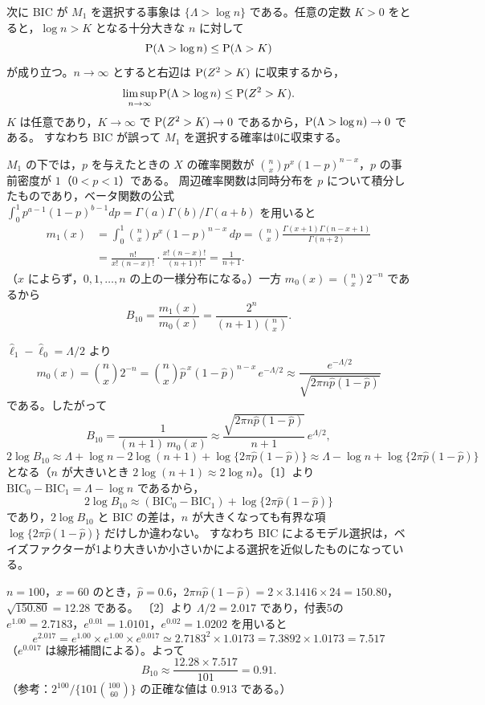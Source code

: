 \documentclass[a4paper,11pt]{ltjsarticle}
\begin{document}
次に BIC が $M_1$ を選択する事象は $\{\Lambda>\log n\}$ である。任意の定数 $K>0$ をとると，$\log n>K$ となる十分大きな $n$ に対して
\[
\operatorname{P}(\Lambda>\log n)\le\operatorname{P}(\Lambda>K)
\]
が成り立つ。$n\to\infty$ とすると右辺は $\operatorname{P}(Z^2>K)$ に収束するから，
\[
\limsup_{n\to\infty}\operatorname{P}(\Lambda>\log n)\le\operatorname{P}(Z^2>K).
\]
$K$ は任意であり，$K\to\infty$ で $\operatorname{P}(Z^2>K)\to0$ であるから，$\operatorname{P}(\Lambda>\log n)\to0$ である。
すなわち BIC が誤って $M_1$ を選択する確率は0に収束する。

$M_1$ の下では，$p$ を与えたときの $X$ の確率関数が $\binom nxp^x(1-p)^{n-x}$，$p$ の事前密度が $1$（$0<p<1$）である。
周辺確率関数は同時分布を $p$ について積分したものであり，ベータ関数の公式
$\int_0^1p^{a-1}(1-p)^{b-1}dp=\Gamma(a)\Gamma(b)/\Gamma(a+b)$ を用いると
\begin{align*}
m_1(x)&=\int_0^1\binom nxp^x(1-p)^{n-x}\,dp=\binom nx\frac{\Gamma(x+1)\Gamma(n-x+1)}{\Gamma(n+2)}\\
&=\frac{n!}{x!\,(n-x)!}\cdot\frac{x!\,(n-x)!}{(n+1)!}=\boxed{\frac{1}{n+1}}.
\end{align*}
（$x$ によらず，$0,1,\ldots,n$ の上の一様分布になる。）一方 $m_0(x)=\binom nx2^{-n}$ であるから
\[
B_{10}=\frac{m_1(x)}{m_0(x)}=\boxed{\frac{2^n}{(n+1)\binom nx}}.
\]

$\hat\ell_1-\hat\ell_0=\Lambda/2$ より
\[
m_0(x)=\binom nx2^{-n}=\binom nx\hat p^{\,x}(1-\hat p)^{n-x}\,e^{-\Lambda/2}
\approx\frac{e^{-\Lambda/2}}{\sqrt{2\pi n\hat p(1-\hat p)}}
\]
である。したがって
\[
B_{10}=\frac{1}{(n+1)\,m_0(x)}\approx\frac{\sqrt{2\pi n\hat p(1-\hat p)}}{n+1}\,e^{\Lambda/2},
\]
\[
2\log B_{10}\approx\Lambda+\log n-2\log(n+1)+\log\{2\pi\hat p(1-\hat p)\}
\approx\boxed{\Lambda-\log n+\log\{2\pi\hat p(1-\hat p)\}}
\]
となる（$n$ が大きいとき $2\log(n+1)\approx2\log n$）。〔1〕より $\mathrm{BIC}_0-\mathrm{BIC}_1=\Lambda-\log n$ であるから，
\[
2\log B_{10}\approx(\mathrm{BIC}_0-\mathrm{BIC}_1)+\log\{2\pi\hat p(1-\hat p)\}
\]
であり，$2\log B_{10}$ と BIC の差は，$n$ が大きくなっても有界な項 $\log\{2\pi\hat p(1-\hat p)\}$ だけしか違わない。
すなわち BIC によるモデル選択は，ベイズファクターが1より大きいか小さいかによる選択を近似したものになっている。

$n=100$，$x=60$ のとき，$\hat p=0.6$，$2\pi n\hat p(1-\hat p)=2\times3.1416\times24=150.80$，$\sqrt{150.80}=12.28$ である。
〔2〕より $\Lambda/2=2.017$ であり，付表5の $e^{1.00}=2.7183$，$e^{0.01}=1.0101$，$e^{0.02}=1.0202$ を用いると
\[
e^{2.017}=e^{1.00}\times e^{1.00}\times e^{0.017}\simeq2.7183^2\times1.0173=7.3892\times1.0173=7.517
\]
（$e^{0.017}$ は線形補間による）。よって
\[
B_{10}\approx\frac{12.28\times7.517}{101}=\boxed{0.91}.
\]
（参考：$2^{100}/\{101\binom{100}{60}\}$ の正確な値は $0.913$ である。）
\end{document}
